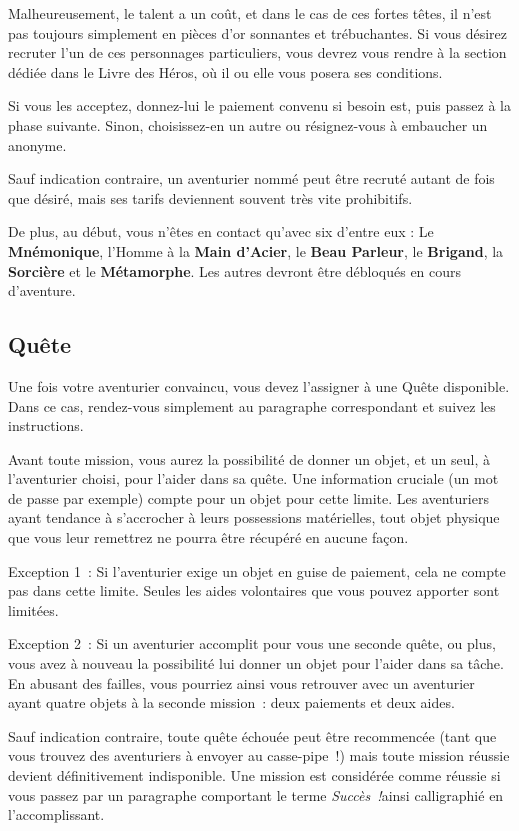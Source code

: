\documentclass{report}
\newcommand{\success}{\emph{Succès !}}
\newcommand{\hero}[1]{\textbf{#1}}
\begin{document}
Malheureusement, le talent a un coût, et dans le cas de ces fortes têtes, il n'est pas toujours simplement en pièces d'or sonnantes et trébuchantes. Si vous désirez recruter l'un de ces personnages particuliers, vous devrez vous rendre à la section dédiée dans le Livre des Héros, où il ou elle vous posera ses conditions.

Si vous les acceptez, donnez-lui le paiement convenu si besoin est, puis passez à la phase suivante. Sinon, choisissez-en un autre ou résignez-vous à embaucher un anonyme.

Sauf indication contraire, un aventurier nommé peut être recruté autant de fois que désiré, mais ses tarifs deviennent souvent très vite prohibitifs.

De plus, au début, vous n'êtes en contact qu'avec six d'entre eux : Le \hero{Mnémonique}, l’Homme à la \hero{Main d’Acier}, le \hero{Beau Parleur}, le \hero{Brigand}, la \hero{Sorcière} et le \hero{Métamorphe}. Les autres devront être débloqués en cours d'aventure.

\subsection{Quête}

Une fois votre aventurier convaincu, vous devez l'assigner à une Quête disponible. Dans ce cas, rendez-vous simplement au paragraphe correspondant et suivez les instructions.

Avant toute mission, vous aurez la possibilité de donner un objet, et un seul, à l'aventurier choisi, pour l'aider dans sa quête. Une information cruciale (un mot de passe par exemple) compte pour un objet pour cette limite. Les aventuriers ayant tendance à s'accrocher à leurs possessions matérielles, tout objet physique que vous leur remettrez ne pourra être récupéré en aucune façon.

Exception 1 : Si l'aventurier exige un objet en guise de paiement, cela ne compte pas dans cette limite. Seules les aides volontaires que vous pouvez apporter sont limitées.

Exception 2 : Si un aventurier accomplit pour vous une seconde quête, ou plus, vous avez à nouveau la possibilité lui donner un objet pour l'aider dans sa tâche. En abusant des failles, vous pourriez ainsi vous retrouver avec un aventurier ayant quatre objets à la seconde mission : deux paiements et deux aides.

Sauf indication contraire, toute quête échouée peut être recommencée (tant que vous trouvez des aventuriers à envoyer au casse-pipe !) mais toute mission réussie devient définitivement indisponible. Une mission est considérée comme réussie si vous passez par un paragraphe comportant le terme \success ainsi calligraphié en l'accomplissant.
\end{document}
